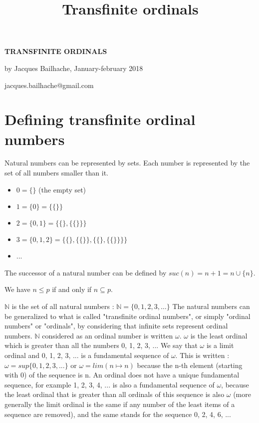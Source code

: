 \documentclass[10pt]{article}
\title{Transfinite ordinals}
\begin{document}
\setlength{\parindent}{0pt}

\vspace{-0.4cm}

\begin{center}
\textbf{TRANSFINITE ORDINALS}

by Jacques Bailhache, January-february 2018

jacques.bailhache@gmail.com
\end{center}

\section{Defining transfinite ordinal numbers}

Natural numbers can be represented by sets. Each number is represented by the set of all numbers smaller than it.
\begin{itemize}
     \setlength{\itemsep}{1pt}
     \setlength{\parskip}{0pt}
     \setlength{\parsep}{0pt}
\item \( 0 = \lbrace\rbrace \) (the empty set)
\item \( 1 = \lbrace 0 \rbrace = \lbrace\lbrace\rbrace\rbrace \)
\item \( 2 = \lbrace 0, 1 \rbrace = \lbrace\lbrace\rbrace,\lbrace\lbrace\rbrace\rbrace\rbrace \)
\item \( 3 = \lbrace 0, 1, 2 \rbrace = \lbrace\lbrace\rbrace,\lbrace\lbrace\rbrace\rbrace,\lbrace\lbrace\rbrace,\lbrace\lbrace\rbrace\rbrace\rbrace\rbrace \)
\item ...
\end{itemize}
The successor of a natural number can be defined by \( suc(n) = n+1 = n \cup \lbrace n \rbrace \).

We have \( n \leq p \) if and only if \( n \subseteq p \).

\( \mathbb{N} \) is the set of all natural numbers : \( \mathbb{N} = \lbrace0,1,2,3,\ldots\rbrace \)
The natural numbers can be generalized to what is called "transfinite ordinal numbers", or simply "ordinal numbers" or "ordinals", by considering that infinite sets represent ordinal numbers. \( \mathbb{N} \) considered as an ordinal number is written \( \omega \).
\( \omega \) is the least ordinal which is greater than all the numbers 0, 1, 2, 3, ... We say that \( \omega \) is a limit ordinal and 0, 1, 2, 3, ... is a fundamental sequence of \( \omega \). This is written : \( \omega = sup \lbrace 0, 1, 2, 3, ... \rbrace \) or \( \omega = lim ( n \mapsto n )  \) because the n-th element (starting with 0) of the sequence is n. An ordinal does not have a unique fundamental sequence, for example 1, 2, 3, 4, ... is also a fundamental sequence of \( \omega \), because the least ordinal that is greater than all ordinals of this sequence is also \( \omega \) (more generally the limit ordinal is the same if any number of the least items of a sequence are removed), and the same stands for the sequence 0, 2, 4, 6, ...
\end{document}
